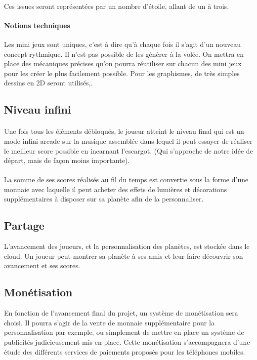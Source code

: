\paragraph{}
Ces issues seront représentées par un nombre d'étoile, allant de un à trois.

\paragraph{Notions techniques}
Les mini jeux sont uniques, c’est à dire qu’à chaque fois il s’agit d’un nouveau concept rythmique. Il n’est pas possible de les générer à la volée. On mettra en place des mécaniques précises qu’on pourra réutiliser sur chacun des mini jeux pour les créer le plus facilement possible. Pour les graphismes, de très simples dessins en 2D seront utilisés,. 

\subsection{Niveau infini}
\paragraph{} Une fois tous les éléments débloqués, le joueur atteint le niveau final qui est un mode infini arcade sur la musique assemblée dans lequel il peut essayer de réaliser le meilleur score possible en incarnant l’escargot. (Qui s’approche de notre idée de départ, mais de façon moins importante).

\paragraph{} La somme de ses scores réalisés au fil du temps est convertie sous la forme d’une monnaie avec laquelle il peut acheter des effets de lumières et décorations supplémentaires à disposer sur sa planète afin de la personnaliser.

\subsection{Partage}
L’avancement des joueurs, et la personnalisation des planètes, est stockée dans le cloud. Un joueur peut montrer sa planète à ses amis et leur faire découvrir son avancement et ses scores.

\subsection{Monétisation}
En fonction de l’avancement final du projet, un système de monétisation sera choisi. Il pourra s’agir de la vente de monnaie supplémentaire pour la personnalisation par exemple, ou simplement de mettre en place un système de publicités judicieusement mis en place. Cette monétisation s'accompagnera d'une étude des différents services de paiements proposés pour les téléphones mobiles.


